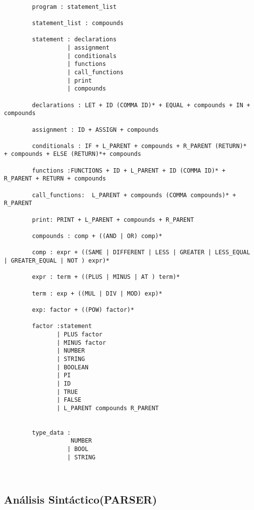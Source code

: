 \documentclass[a4paper,12pt]{article}
\begin{document}
    \begin{lstlisting}

        program : statement_list
    
        statement_list : compounds
        
        statement : declarations
                  | assignment
                  | conditionals
                  | functions
                  | call_functions  
                  | print
                  | compounds
        
        declarations : LET + ID (COMMA ID)* + EQUAL + compounds + IN + compounds
        
        assignment : ID + ASSIGN + compounds
        
        conditionals : IF + L_PARENT + compounds + R_PARENT (RETURN)* + compounds + ELSE (RETURN)*+ compounds
        
        functions :FUNCTIONS + ID + L_PARENT + ID (COMMA ID)* + R_PARENT + RETURN + compounds
        
        call_functions:  L_PARENT + compounds (COMMA compounds)* + R_PARENT 
        
        print: PRINT + L_PARENT + compounds + R_PARENT
        
        compounds : comp + ((AND | OR) comp)*
        
        comp : expr + ((SAME | DIFFERENT | LESS | GREATER | LESS_EQUAL | GREATER_EQUAL | NOT ) expr)*
        
        expr : term + ((PLUS | MINUS | AT ) term)*
        
        term : exp + ((MUL | DIV | MOD) exp)*
        
        exp: factor + ((POW) factor)*
        
        factor :statement 
               | PLUS factor
               | MINUS factor
               | NUMBER
               | STRING
               | BOOLEAN
               | PI
               | ID
               | TRUE
               | FALSE
               | L_PARENT compounds R_PARENT
        
        
        type_data : 
                   NUMBER 
                  | BOOL 
                  | STRING
        
        
     \end{lstlisting}
    
\subsection{An\'alisis Sint\'actico(PARSER) }\label{sub:center}
\end{document}
